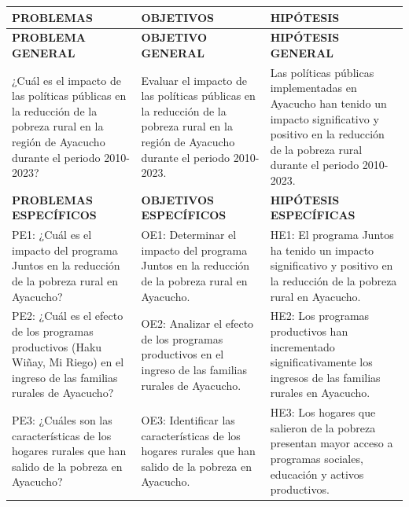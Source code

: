 \documentclass[
  man,
  floatsintext,
  longtable,
  a4paper,
  nolmodern,
  notxfonts,
  notimes,
  12pt,
  colorlinks=true,linkcolor=blue,citecolor=blue,urlcolor=blue]{apa7}
\newcounter{none} %
\begin{document}
{\def\LTcaptype{none} %
\begin{longtable}[]{@{}
  >{\raggedright\arraybackslash}p{}
  >{\raggedright\arraybackslash}p{}
  >{\raggedright\arraybackslash}p{}@{}}
\toprule\noalign{}
\begin{minipage}[b]{\linewidth}\raggedright
PROBLEMAS
\end{minipage} & \begin{minipage}[b]{\linewidth}\raggedright
OBJETIVOS
\end{minipage} & \begin{minipage}[b]{\linewidth}\raggedright
HIPÓTESIS
\end{minipage} \\
\midrule\noalign{}
\endhead
\bottomrule\noalign{}
\endlastfoot
\textbf{PROBLEMA GENERAL} & \textbf{OBJETIVO GENERAL} &
\textbf{HIPÓTESIS GENERAL} \\
¿Cuál es el impacto de las políticas públicas en la reducción de la
pobreza rural en la región de Ayacucho durante el periodo 2010-2023? &
Evaluar el impacto de las políticas públicas en la reducción de la
pobreza rural en la región de Ayacucho durante el periodo 2010-2023. &
Las políticas públicas implementadas en Ayacucho han tenido un impacto
significativo y positivo en la reducción de la pobreza rural durante el
periodo 2010-2023. \\
\textbf{PROBLEMAS ESPECÍFICOS} & \textbf{OBJETIVOS ESPECÍFICOS} &
\textbf{HIPÓTESIS ESPECÍFICAS} \\
PE1: ¿Cuál es el impacto del programa Juntos en la reducción de la
pobreza rural en Ayacucho? & OE1: Determinar el impacto del programa
Juntos en la reducción de la pobreza rural en Ayacucho. & HE1: El
programa Juntos ha tenido un impacto significativo y positivo en la
reducción de la pobreza rural en Ayacucho. \\
PE2: ¿Cuál es el efecto de los programas productivos (Haku Wiñay, Mi
Riego) en el ingreso de las familias rurales de Ayacucho? & OE2:
Analizar el efecto de los programas productivos en el ingreso de las
familias rurales de Ayacucho. & HE2: Los programas productivos han
incrementado significativamente los ingresos de las familias rurales en
Ayacucho. \\
PE3: ¿Cuáles son las características de los hogares rurales que han
salido de la pobreza en Ayacucho? & OE3: Identificar las características
de los hogares rurales que han salido de la pobreza en Ayacucho. & HE3:
Los hogares que salieron de la pobreza presentan mayor acceso a
programas sociales, educación y activos productivos. \\
\end{longtable}
}
\end{document}

